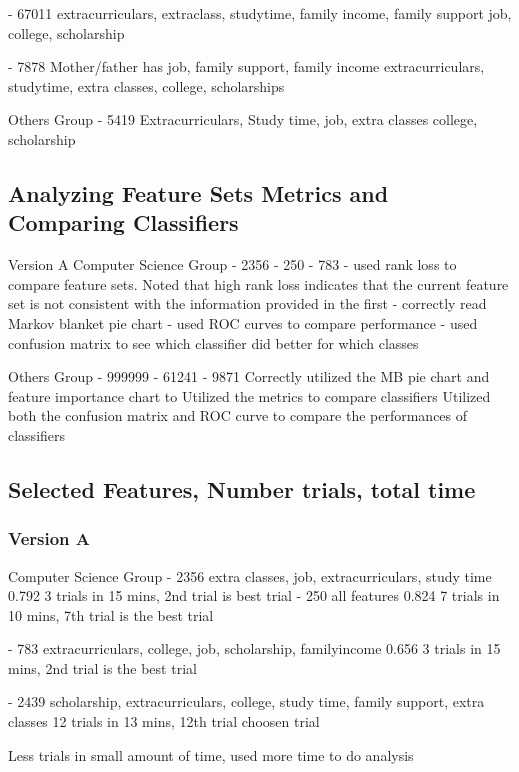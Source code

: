 - 67011
    extracurriculars, extraclass, studytime, family income, family support
    job, college, scholarship
    
- 7878
    Mother/father has job, family support, family income
    extracurriculars, studytime, extra classes, college, scholarships
    
Others Group
- 5419
    Extracurriculars, Study time, job, extra classes
    college, scholarship

    
\subsection { Analyzing Feature Sets Metrics and Comparing Classifiers }
Version A
Computer Science Group 
- 2356 
- 250
- 783
    - used rank loss to compare feature sets. Noted that high rank loss indicates that the current feature set is not consistent with the information provided in the first
    - correctly read Markov blanket pie chart 
    - used ROC curves to compare performance
    - used confusion matrix to see which classifier did better for which classes

Others Group
- 999999 
- 61241 
- 9871  
    Correctly utilized the MB pie chart and feature importance chart to 
    Utilized the metrics to compare classifiers
    Utilized both the confusion matrix and ROC curve to compare the performances of classifiers

\subsection { Selected Features, Number trials, total time }
\subsubsection { Version A }
Computer Science Group 
- 2356 
    extra classes, job, extracurriculars, study time
    0.792
     3 trials in 15 mins, 2nd trial is best trial 
- 250 
    all features
    0.824
    7 trials in 10 mins, 7th trial is the best trial 
    
- 783 
    extracurriculars, college, job, scholarship, familyincome
    0.656
    3 trials in 15 mins, 2nd trial is the best trial
    
- 2439
    scholarship, extracurriculars, college, study time, family support, extra classes
    12 trials in 13 mins, 12th trial choosen trial
    
Less trials in small amount of time, used more time to do analysis 

